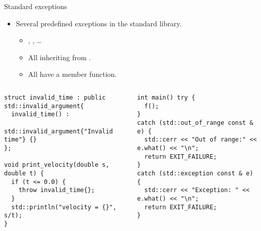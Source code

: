 \begin{frame}[t,fragile]{Standard exceptions}
\begin{itemize}
  \item Several predefined exceptions in the standard library.
    \begin{itemize}
      \item {}, , \ldots
      \item All inheriting from .
      \item All have a  member function.
    \end{itemize}
\end{itemize}
\begin{columns}[T]

\begin{lstlisting}
struct invalid_time : public std::invalid_argument{
  invalid_time() :
    std::invalid_argument{"Invalid time"} {}
};

void print_velocity(double s, double t) {
  if (t <= 0.0) {
    throw invalid_time{};
  }
  std::println("velocity = {}", s/t);
}
\end{lstlisting}

\begin{lstlisting}
int main() try {
  f();
}
catch (std::out_of_range const & e) {
  std::cerr << "Out of range:" << e.what() << "\n";
  return EXIT_FAILURE;
}
catch (std::exception const & e) {
  std::cerr << "Exception: " << e.what() << "\n";
  return EXIT_FAILURE;
}
\end{lstlisting}
\end{columns}

\end{frame}
